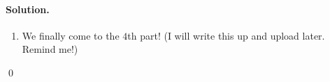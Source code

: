 \documentclass[12pt]{article}
\newenvironment{solution}
{\paragraph{Solution.}}
{\qed\eject}
\begin{document}
\begin{solution}
\begin{enumerate}
    Now, we have \[10\beta=q_1+\cdots q_{10}=(1+\alpha+\cdots \alpha^9)q_1\implies q_i=\frac{10\beta(1-\alpha)\alpha^{i-1}}{1-\alpha^{10}}\]
    And finally, $e_i=q_1+\cdots q_i-i\beta=\frac{10\beta (1-\alpha^i)}{1-\alpha^{10}}-i\beta$\qed

    I will let you find the general versions!
    \item We finally come to the $4$th part! (I will write this up and upload later. Remind me!)
\end{enumerate}
\end{solution}
\end{document}

